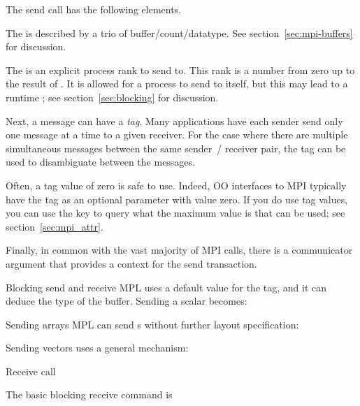 The send call has the following elements.

The  is described by a trio of buffer/count/datatype.
See section~\ref{sec:mpi-buffers} for discussion.

The   is an
explicit process rank to send to.  This rank is a number from zero up
to the result of .
It is allowed for a process to send to itself, but
this may lead to a runtime ;
see section~\ref{sec:blocking} for discussion.

Next, a message can have a
\emph{tag}.
Many applications have each sender send only one message at a time
to a given receiver.
For the case where there are
multiple simultaneous messages between the same sender~/ receiver pair,
the tag can be used to disambiguate between
the messages.

Often, a tag value of zero is safe to use.
Indeed, \ac{OO} interfaces to MPI typically have  the tag
as an optional parameter with value zero.
If you do
use tag values, you can use the key  to query
what the maximum value is that can be used; see
section~\ref{sec:mpi_attr}.

Finally, in common with the vast majority of MPI calls,
there is a communicator argument that provides a context for the send transaction.

\begin{mplnote}{Blocking send and receive}
  \ac{MPL} uses a default value for the tag, and it can deduce the type
  of the buffer. Sending a scalar becomes:
\end{mplnote}

\begin{mplnote}{Sending arrays}
  \ac{MPL} can send s
  without further layout specification:

  Sending vectors uses a general mechanism:
  
\end{mplnote}

 {Receive call}

The basic blocking receive command is
%

